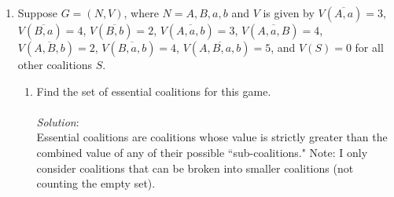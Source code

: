 \documentclass{article}
\begin{document}
\begin{enumerate}
\begin{enumerate}













    \end{enumerate}

%
\hfill\newline
\item Suppose $G = (N, V)$, where $N = {A, B, a, b}$ and $V$ is given by $V(\overline{A, a}) = 3$, $V(\overline{B, a}) = 4$, $V(\overline{B, b}) = 2$, $V(\overline{A, a, b}) = 3$, $V(\overline{A, a, B}) = 4$, $V(\overline{A, B, b}) = 2$, $V(\overline{B, a, b}) = 4$, $V(\overline{A, B, a, b}) = 5$, and $V(S) = 0$ for all other coalitions $S$.
    \begin{enumerate}
    \item Find the set of essential coalitions for this game.\\\\
    \textit{Solution}:\\
    Essential coalitions are coalitions whose value is strictly greater than the combined value of any of their possible ``sub-coalitions." Note: I only consider coalitions that can be broken into smaller coalitions (not counting the empty set). \\


\end{enumerate}
\end{enumerate}
\end{document}

